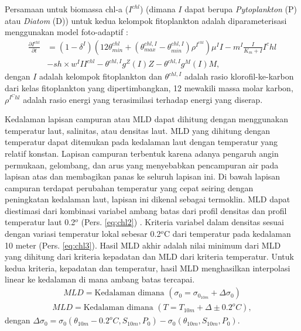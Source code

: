 \begin{spacing}{1.5}
	Persamaan untuk biomassa chl-a ($I^{chl}$) (dimana $I$ dapat berupa \textit{Pytoplankton} (P) atau \textit{Diatom} (D)) untuk kedua kelompok fitoplankton adalah diparameterisasi menggunakan model foto-adaptif :
	\begin{equation}\label{eq:chl1}
		\begin{aligned}
			\frac{\partial I^{chl}}{\partial t} &= (1-\delta ^I)(12\theta^{chl}_{min}+(\theta^{chl,I}_{max}-\theta^{chl,I}_{min})\rho^{I^{chl}})\mu^I I-m^I \frac{I}{K_m +I}I^chl \\
			&- sh \times w^I II^{chl}-\theta^{chl,I}g^Z(I)Z-\theta^{chl,I}g^M(I)M,
		\end{aligned}
	\end{equation}
	dengan $I$ adalah kelompok fitoplankton dan $\theta^{chl,I}$ adalah rasio klorofil-ke-karbon dari kelas fitoplankton yang dipertimbangkan, 12 mewakili massa molar karbon, $\rho^{I^Chl}$ adalah rasio energi yang terasimilasi terhadap energi yang diserap.
	
	Kedalaman lapisan campuran atau MLD dapat dihitung dengan menggunakan temperatur laut, salinitas, atau densitas laut. MLD yang dihitung dengan temperatur dapat ditemukan pada kedalaman laut dengan temperatur yang relatif konstan. Lapisan campuran terbentuk karena adanya pengaruh angin permukaan, gelombang, dan arus yang menyebabkan pencampuran air pada lapisan atas dan membagikan panas ke seluruh lapisan ini. Di bawah lapisan campuran terdapat perubahan temperatur yang cepat seiring dengan peningkatan kedalaman laut, lapisan ini dikenal sebagai termoklin. MLD dapat diestimasi dari kombinasi variabel ambang batas dari profil densitas dan profil temperatur laut 0.2$^o$ (Pers. \ref{eq:chl2}) \cite{Boyer2004}. 
	Kriteria variabel dalam densitas sesuai dengan variasi temperatur lokal sebesar 0.2$^o$C dari temperatur pada kedalaman 10 meter (Pers. \ref{eq:chl3}). Hasil MLD akhir adalah nilai minimum dari MLD yang dihitung dari kriteria kepadatan dan MLD dari kriteria temperatur. Untuk kedua kriteria, kepadatan dan temperatur, hasil MLD menghasilkan interpolasi linear ke kedalaman di mana ambang batas tercapai.
	\begin{equation}\label{eq:chl2}
		\begin{aligned}
			MLD= \text{Kedalaman dimana }(\sigma_0=\sigma_{0_{10m}}+\Delta \sigma_0)
		\end{aligned}
	\end{equation}
	\begin{equation}\label{eq:chl3}
		\begin{aligned}
			MLD= \text{Kedalaman dimana }(T=T_{10m}+\Delta \pm 0.2^oC),
		\end{aligned}
	\end{equation}
	dengan $\Delta \sigma_0=\sigma_0(\theta_{10m}-0.2^oC,S_{10m},P_0)-\sigma_0(\theta_{10m},S_{10m},P_0)$.

\end{spacing}
